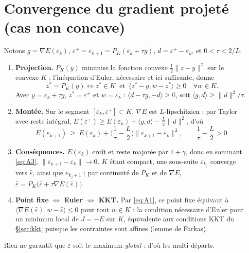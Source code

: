 \documentclass[11pt,a4paper]{article}
\newcommand{\sca}[2]{\langle #1,#2\rangle}
\newcommand{\nr}[1]{\|#1\|}
\theoremstyle{plain}
\theoremstyle{definition}
\begin{document}
\section{Convergence du gradient projeté (cas non concave)}\label{app:convergence}
Notons $g=\nabla E(\varepsilon_k)$, $\varepsilon^+=\varepsilon_{k+1}=P_K(\varepsilon_k+\tau g)$, $d=\varepsilon^+-\varepsilon_k$, et $0<\tau<2/L$.
\begin{enumerate}
\item \textbf{Projection.} $P_K(y)$ minimise la fonction convexe $\tfrac12\nr{z-y}^2$ sur le convexe $K$ ; l'inéquation d'Euler, nécessaire et ici suffisante, donne
\begin{equation*}\label{eq:A1}
z^*=P_K(y)\iff z^*\in K\ \text{ et }\ \sca{z^*-y}{w-z^*}\ge0\quad\forall w\in K.\tag{A.1}
\end{equation*}
Avec $y=\varepsilon_k+\tau g$, $z^*=\varepsilon^+$ et $w=\varepsilon_k$ : $\sca{d-\tau g}{-d}\ge0$, soit $\sca{g}{d}\ge\nr{d}^2/\tau$.
\item \textbf{Montée.} Sur le segment $[\varepsilon_k,\varepsilon^+]\subset K$, $\nabla E$ est $L$-lipschitzien ; par Taylor avec reste intégral, $E(\varepsilon^+)\ge E(\varepsilon_k)+\sca{g}{d}-\frac L2\nr{d}^2$, d'où
\begin{equation*}\label{eq:A3}
E(\varepsilon_{k+1})\ \ge\ E(\varepsilon_k)+\Big(\frac1\tau-\frac L2\Big)\nr{\varepsilon_{k+1}-\varepsilon_k}^2,\qquad \frac1\tau-\frac L2>0.\tag{A.2}
\end{equation*}
\item \textbf{Conséquences.} $E(\varepsilon_k)$ croît et reste majorée par $1+\gamma$, donc en sommant \eqref{eq:A3}, $\nr{\varepsilon_{k+1}-\varepsilon_k}\to0$. $K$ étant compact, une sous-suite $\varepsilon_{k_j}$ converge vers $\bar\varepsilon$, ainsi que $\varepsilon_{k_j+1}$ ; par continuité de $P_K$ et de $\nabla E$, $\bar\varepsilon=P_K\big(\bar\varepsilon+\tau\nabla E(\bar\varepsilon)\big)$.
\item \textbf{Point fixe $\iff$ Euler $\iff$ KKT.} Par \eqref{eq:A1}, ce point fixe équivaut à $\sca{\nabla E(\bar\varepsilon)}{w-\bar\varepsilon}\le0$ pour tout $w\in K$ : la condition nécessaire d'Euler pour un minimum local de $J=-E$ sur $K$, équivalente aux conditions KKT du §\ref{sec:kkt} puisque les contraintes sont affines (lemme de Farkas).
\end{enumerate}
Rien ne garantit que $\bar\varepsilon$ soit le maximum \emph{global} : d'où les multi-départs.
\end{document}
